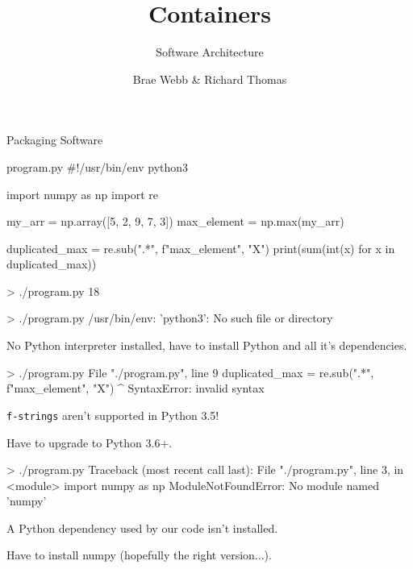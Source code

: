 \documentclass{slide}
\title{Containers}
\subtitle{Software Architecture}
\author{Brae Webb \& Richard Thomas}
\date{\week{3}}
\begin{document}
\maketitle



\begin{frame}[fragile]{Packaging Software}
    \vspace{-1em}
    \begin{code}[language=python]{program.py}
#!/usr/bin/env python3

import numpy as np
import re

my_arr = np.array([5, 2, 9, 7, 3])
max_element = np.max(my_arr)

duplicated_max = re.sub(".*", f"{max_element}", "X")
print(sum(int(x) for x in duplicated_max))
    \end{code}
    \begin{code}[numbers=none]{}
> ./program.py
18
    \end{code}
\end{frame}


\begin{frame}[fragile]
    \begin{code}[numbers=none]{}
> ./program.py
/usr/bin/env: 'python3': No such file or directory
    \end{code}
    \pause
    No Python interpreter installed,
    have to install Python and all it's dependencies.
\end{frame}

\begin{frame}[fragile]
    \begin{code}[numbers=none]{}
> ./program.py
File "./program.py", line 9
    duplicated_max = re.sub(".*", f"{max_element}", "X")
                                                 ^
SyntaxError: invalid syntax
    \end{code}
    \pause
    \texttt{f-strings} aren't supported in Python 3.5!
    
    Have to upgrade to Python 3.6+.
\end{frame}

\begin{frame}[fragile]
    \begin{code}[numbers=none]{}
> ./program.py
Traceback (most recent call last):
  File "./program.py", line 3, in <module>
    import numpy as np
ModuleNotFoundError: No module named 'numpy'
    \end{code}
    \pause
    A Python dependency used by our code isn't installed.
    
    Have to install numpy (hopefully the right version...).
\end{frame}
\end{document}
